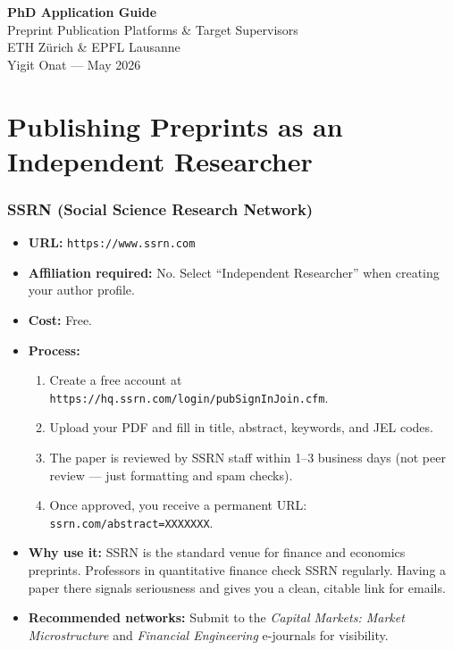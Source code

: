 \documentclass[11pt,a4paper]{article}
\newcommand{\url}[1]{\texttt{#1}}
\begin{document}
\begin{center}
{\LARGE\bfseries PhD Application Guide}\\[0.3cm]
{\Large Preprint Publication Platforms \& Target Supervisors}\\[0.3cm]
{\large ETH Z\"urich \& EPFL Lausanne}\\[0.5cm]
{\large Yigit Onat --- May 2026}
\end{center}

\bigskip
\tableofcontents
\newpage

\part{Publishing Preprints as an Independent Researcher}

\section{SSRN (Social Science Research Network)}

\begin{itemize}
  \item \textbf{URL:} \url{https://www.ssrn.com}
  \item \textbf{Affiliation required:} No. Select ``Independent Researcher'' when creating your author profile.
  \item \textbf{Cost:} Free.
  \item \textbf{Process:}
    \begin{enumerate}
      \item Create a free account at \url{https://hq.ssrn.com/login/pubSignInJoin.cfm}.
      \item Upload your PDF and fill in title, abstract, keywords, and JEL codes.
      \item The paper is reviewed by SSRN staff within 1--3 business days (not peer review --- just formatting and spam checks).
      \item Once approved, you receive a permanent URL: \texttt{ssrn.com/abstract=XXXXXXX}.
    \end{enumerate}
  \item \textbf{Why use it:} SSRN is the standard venue for finance and economics preprints. Professors in quantitative finance check SSRN regularly. Having a paper there signals seriousness and gives you a clean, citable link for emails.
  \item \textbf{Recommended networks:} Submit to the \textit{Capital Markets: Market Microstructure} and \textit{Financial Engineering} e-journals for visibility.
\end{itemize}
\end{document}
